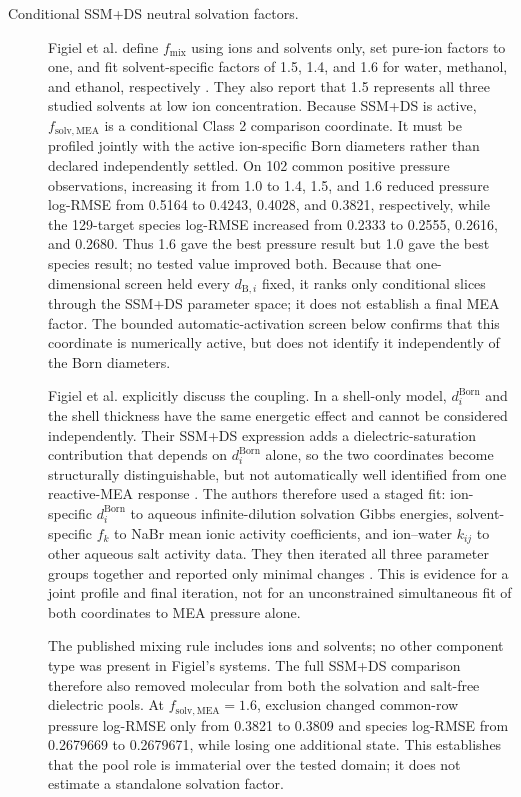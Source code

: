 \documentclass[10pt,oneside]{scrartcl}
\begin{document}
\begin{description}
\item[Conditional SSM+DS neutral solvation factors.] Figiel et al. define
$f_{\mathrm{mix}}$ using ions and solvents only, set pure-ion factors to one,
and fit solvent-specific factors of 1.5, 1.4, and 1.6 for water, methanol, and
ethanol, respectively \cite[Eqns.~8--10 and Table~2]{Figiel2025}. They also
report that 1.5 represents all three studied solvents at low ion concentration.
Because SSM+DS is active, $f_{\mathrm{solv},\mathrm{MEA}}$ is a conditional
Class 2 comparison coordinate. It must be profiled jointly with the active ion-specific
Born diameters rather than declared independently settled. On 102 common
positive pressure observations, increasing it
from 1.0 to 1.4, 1.5, and 1.6 reduced pressure log-RMSE from 0.5164 to 0.4243,
0.4028, and 0.3821, respectively, while the 129-target species log-RMSE
increased from 0.2333 to 0.2555, 0.2616, and 0.2680. Thus 1.6 gave the best
pressure result but 1.0 gave the best species result; no tested value improved
both. Because that one-dimensional screen held every $d_{\mathrm B,i}$ fixed,
it ranks only conditional slices through the SSM+DS parameter space; it does
not establish a final MEA factor. The bounded automatic-activation screen
below confirms that this coordinate is numerically active, but does not
identify it independently of the Born diameters.

Figiel et al. explicitly discuss the coupling. In a shell-only model,
$d_i^{\mathrm{Born}}$ and the shell thickness have the same energetic effect
and cannot be considered independently. Their SSM+DS expression adds a
dielectric-saturation contribution that depends on $d_i^{\mathrm{Born}}$
alone, so the two coordinates become structurally distinguishable, but not
automatically well identified from one reactive-MEA response
\cite[p.~9408]{Figiel2025}. The authors therefore used a staged fit:
ion-specific $d_i^{\mathrm{Born}}$ to aqueous infinite-dilution solvation Gibbs
energies, solvent-specific $f_k$ to NaBr mean ionic activity coefficients, and
ion--water $k_{ij}$ to other aqueous salt activity data. They then iterated all
three parameter groups together and reported only minimal changes
\cite[p.~9411]{Figiel2025}. This is evidence for a joint profile and final
iteration, not for an unconstrained simultaneous fit of both coordinates to
MEA pressure alone.

The published mixing rule includes ions and solvents; no other component type
was present in Figiel's systems. The full SSM+DS comparison therefore also
removed molecular  from both the solvation and salt-free dielectric
pools. At $f_{\mathrm{solv},\mathrm{MEA}}=1.6$, exclusion changed common-row
pressure log-RMSE only from 0.3821 to 0.3809 and species log-RMSE from 0.2679669
to 0.2679671, while losing one additional state. This establishes that the
 pool role is immaterial over the tested domain; it does not estimate a
standalone  solvation factor.


\end{description}
\end{document}
